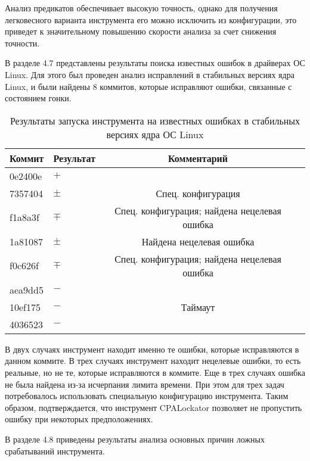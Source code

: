 Анализ предикатов обеспечивает высокую точность, однако для получения легковесного варианта инструмента его можно исключить из конфигурации, это приведет к значительному повышению скорости анализа за счет снижения точности.

В разделе 4.7 представлены результаты поиска известных ошибок в драйверах ОС Linux.
Для этого был проведен анализ исправлений в стабильных версиях ядра Linux, и были найдены 8 коммитов, которые исправляют ошибки, связанные с состоянием гонки.

  \begin{table}[h] \footnotesize \centering
    \caption{Результаты запуска инструмента на известных ошибках в стабильных версиях ядра ОС Linux}
  	\label{table-commits}
    \begin{tabular}{ | l | l | c | l |}
      \hline
      Коммит         	& Результат  & Комментарий \\ \hline
      0e2400e			& $+$   		& 	\\ 
      7357404			& $\pm$   		& 	Спец. конфигурация\\ \hline
      f1a8a3f			& $\mp$   		& Спец. конфигурация; найдена нецелевая ошибка \\ %
      1a81087			& $\pm$   		& Найдена нецелевая ошибка \\
      f0c626f			& $\mp$   		& Спец. конфигурация; найдена нецелевая ошибка \\ \hline %
      aea9dd5			& $-$   		& \\ %
      10ef175			& $-$   		& Таймаут	\\ 
      4036523			& $-$   		& \\ 
      \hline
    \end{tabular}
  \end{table}
  
В двух случаях инструмент находит именно те ошибки, которые исправляются в данном коммите.
В трех случаях инструмент находит нецелевые ошибки, то есть реальные, но не те, которые исправляются в коммите.
Еще в трех случаях ошибка не была найдена из-за исчерпания лимита времени.
При этом для трех задач потребовалось использовать специальную конфигурацию инструмента.
Таким образом, подтверждается, что инструмент CPALockator позволяет не пропустить ошибку при некоторых предположениях.

В разделе 4.8 приведены результаты анализа основных причин ложных срабатываний инструмента.

